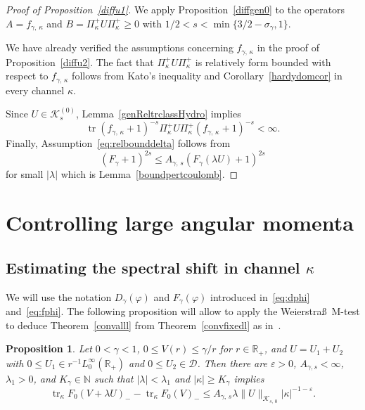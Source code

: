 \documentclass[10pt]{amsart}
\newtheorem{prop}[cdrthm]{Proposition}
\theoremstyle{definition}
\DeclareMathOperator{\tr}{tr}
\newcommand*\nz{\mathbb{N}}
\newcommand*\rz{\mathbb{R}}
\newcommand*\cD{\mathcal{D}}
\newcommand*\cK{\mathcal{K}}
\newcommand*\ppp{\Pi^+_\kappa}
\begin{document}
\begin{proof}[Proof of Proposition~\ref{diffu1}]
We apply Proposition~\ref{diffgen0} to the operators $ A = f_{\gamma,\,\kappa}$ and $B =\ppp U \ppp\geq 0$ with $1/2<s<\min\{3/2-\sigma_\gamma,1\}$.

We have already verified the assumptions concerning $f_{\gamma,\,\kappa}$ in the proof of Proposition~\ref{diffu2}. The fact that $\ppp U\ppp$ is relatively form bounded with respect to $f_{\gamma,\,\kappa}$ follows from Kato's inequality and Corollary~\ref{hardydomcor} in every channel $\kappa$.

Since $U\in\cK_{s}^{(0)}$, Lemma~\ref{genReltrclassHydro} implies
\[
\tr\left(f_{\gamma,\,\kappa}+1\right)^{-s}\ppp U\ppp\left(f_{\gamma,\,\kappa}+1\right)^{-s}<\infty.
\]
Finally, Assumption~\eqref{eq:relbounddelta} follows from
\[
\left(F_\gamma+1\right)^{2s}\leq A_{\gamma,\,s}\left(F_{\gamma}(\lambda U)+1\right)^{2s}
\]
for small $|\lambda|$ which is Lemma~\ref{boundpertcoulomb}.
\end{proof}



\section{Controlling large angular momenta}\label{s:alll}

\subsection{Estimating the spectral shift in channel \texorpdfstring{$\kappa$}{kappa}}
We will use the notation $D_\gamma(\varphi)$ and $F_\gamma(\varphi)$ introduced in~\eqref{eq:dphi} and~\eqref{eq:fphi}. The following proposition will allow to apply the Weierstra\ss~M-test to deduce Theorem~\ref{convalll} from Theorem~\ref{convfixedl} as in~\cite{Franketal2020P}.

\begin{prop}\label{dominantsigma}
Let $0<\gamma<1$, $0\leq V(r)\leq\gamma/r$ for $r\in\rz_+$, and $U=U_1+U_2$ with $0\leq U_1\in r^{-1}L^\infty_0 (\rz_+)$ and $0\leq U_2\in\cD$. Then there are $\varepsilon>0$, $A_{\gamma,s}<\infty$, $\lambda_1>0$, and $K_\gamma\in\nz$ such that $|\lambda|<\lambda_1$ and $|\kappa|\geq K_\gamma$ implies
\begin{equation}
\tr_\kappa F_0(V+\lambda U)_- -\tr_\kappa F_0(V)_-
\leq A_{\gamma,\,s}\lambda \|U\|_{\cK_{s,\,0}} |\kappa|^{-1-\varepsilon}.
\end{equation}
\end{prop}
\end{document}
